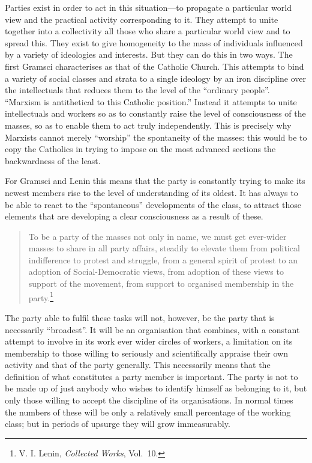 Parties exist in order to act in this situation---to propagate a particular world view and the practical activity corresponding to it. They attempt to unite together into a collectivity all those who share a particular world view and to spread this. They exist to give homogeneity to the mass of individuals influenced by a variety of ideologies and interests. But they can do this in two ways. The first Gramsci characterises as that of the Catholic Church. This attempts to bind a variety of social classes and strata to a single ideology by an iron discipline over the intellectuals that reduces them to the level of the ``ordinary people''. ``Marxism is antithetical to this Catholic position.'' Instead it attempts to unite intellectuals and workers so as to constantly raise the level of consciousness of the masses, so as to enable them to act truly independently. This is precisely why Marxists cannot merely ``worship'' the spontaneity of the masses: this would be to copy the Catholics in trying to impose on the most advanced sections the backwardness of the least.

For Gramsci and Lenin this means that the party is constantly trying to make its newest members rise to the level of understanding of its oldest. It has always to be able to react to the ``spontaneous'' developments of the class, to attract those elements that are developing a clear consciousness as a result of these.

\blockquote{To be a party of the masses not only in name, we must get ever-wider masses to share in all party affairs, steadily to elevate them from political indifference to protest and struggle, from a general spirit of protest to an adoption of Social-Democratic views, from adoption of these views to support of the movement, from support to organised membership in the party.\footnote{V. I. Lenin, \emph{Collected Works}, Vol.~10.}}

The party able to fulfil these tasks will not, however, be the party that is necessarily ``broadest''. It will be an organisation that combines, with a constant attempt to involve in its work ever wider circles of workers, a limitation on its membership to those willing to seriously and scientifically appraise their own activity and that of the party generally. This necessarily means that the definition of what constitutes a party member is important. The party is not to be made up of just anybody who wishes to identify himself as belonging to it, but only those willing to accept the discipline of its organisations. In normal times the numbers of these will be only a relatively small percentage of the working class; but in periods of upsurge they will grow immeasurably.


